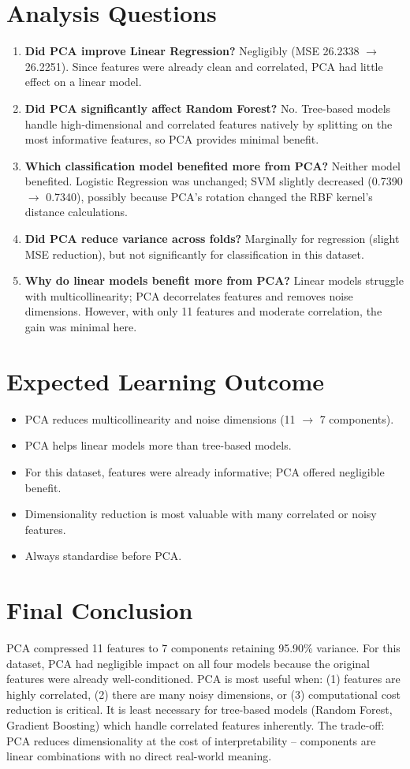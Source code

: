 \documentclass[11pt]{article}
\begin{document}
\section*{Analysis Questions}
\begin{enumerate}
    \item \textbf{Did PCA improve Linear Regression?} Negligibly (MSE 26.2338 $\to$ 26.2251). Since features were already clean and correlated, PCA had little effect on a linear model.
    \item \textbf{Did PCA significantly affect Random Forest?} No. Tree-based models handle high-dimensional and correlated features natively by splitting on the most informative features, so PCA provides minimal benefit.
    \item \textbf{Which classification model benefited more from PCA?} Neither model benefited. Logistic Regression was unchanged; SVM slightly decreased (0.7390 $\to$ 0.7340), possibly because PCA's rotation changed the RBF kernel's distance calculations.
    \item \textbf{Did PCA reduce variance across folds?} Marginally for regression (slight MSE reduction), but not significantly for classification in this dataset.
    \item \textbf{Why do linear models benefit more from PCA?} Linear models struggle with multicollinearity; PCA decorrelates features and removes noise dimensions. However, with only 11 features and moderate correlation, the gain was minimal here.
\end{enumerate}

\section*{Expected Learning Outcome}
\begin{itemize}
    \item PCA reduces multicollinearity and noise dimensions (11 $\to$ 7 components).
    \item PCA helps linear models more than tree-based models.
    \item For this dataset, features were already informative; PCA offered negligible benefit.
    \item Dimensionality reduction is most valuable with many correlated or noisy features.
    \item Always standardise before PCA.
\end{itemize}

\section*{Final Conclusion}
PCA compressed 11 features to 7 components retaining 95.90\% variance. For this dataset, PCA had negligible impact on all four models because the original features were already well-conditioned. PCA is most useful when: (1) features are highly correlated, (2) there are many noisy dimensions, or (3) computational cost reduction is critical. It is least necessary for tree-based models (Random Forest, Gradient Boosting) which handle correlated features inherently. The trade-off: PCA reduces dimensionality at the cost of interpretability -- components are linear combinations with no direct real-world meaning.
\end{document}
